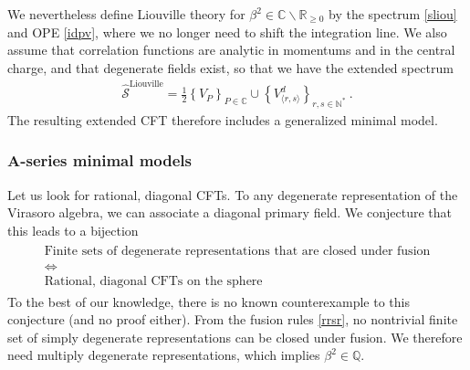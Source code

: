 \documentclass[12pt, a4paper]{article}
\begin{document}
We nevertheless define Liouville theory for $\beta^2\in \mathbb{C}\backslash\mathbb{R}_{\geq 0}$ by the spectrum \eqref{sliou} and OPE \eqref{idpv}, where we no longer need to shift the integration line. 
We also assume that correlation functions are analytic in momentums and in the central charge, and that degenerate fields exist, so that we have the extended spectrum
\begin{align}
 \boxed{ \widehat{\mathcal{S}}^\text{Liouville} = \frac12 \left\{ V_P\right\}_{P\in \mathbb{C}} \cup \left\{ V^d_{\langle r,s\rangle}\right\}_{r,s\in\mathbb{N}^*} }\ .
 \label{stliou}
\end{align}
The resulting extended CFT therefore includes a generalized minimal model. 


\subsubsection{A-series minimal models}\label{sec:amm}

Let us look for rational, diagonal CFTs. 
To any degenerate representation of the Virasoro algebra, we can associate a diagonal primary field. We conjecture that this leads to a bijection 
\begin{align}
\begin{array}{c}
 \text{Finite sets of degenerate representations that are closed under fusion}
 \\
 \iff 
 \\
 \text{Rational, diagonal CFTs on the sphere}
\end{array}
\end{align}
To the best of our knowledge, there is no known counterexample to this conjecture (and no proof either). 
From the fusion rules \eqref{rrsr}, no nontrivial finite set of simply degenerate representations can be closed under fusion. We therefore need multiply degenerate representations, which implies $\beta^2\in\mathbb{Q}$.  
\end{document}
